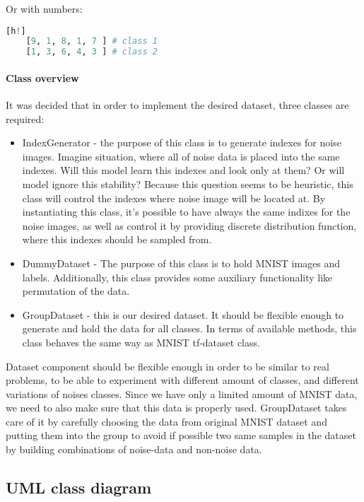 Or with numbers:
\begin{lstlisting}[language=Python][h!]
	[9, 1, 8, 1, 7 ] # class 1
	[1, 3, 6, 4, 3 ] # class 2
\end{lstlisting}



\paragraph{Class overview}

It was decided that in order to implement
the desired dataset, three classes are required:
\begin{itemize}
	\item IndexGenerator - the purpose of this class is to generate indexes for
		noise images. Imagine situation, where all of noise data is placed into
		the same indexes. Will this model learn this indexes and look only at
		them? Or will model ignore this stability? Because this question seems
		to be heuristic, this class will control the indexes where noise image
		will be located at. By instantiating this class, it's possible to have
		always the same indixes for the noise images, as well as control it by
		providing discrete distribution function, where this indexes should be sampled from.
	\item DummyDataset - The purpose of this class is to hold MNIST images
		and labels. Additionally, this class provides some auxiliary functionality
		like permutation of the data.
	\item GroupDataset - this is our desired dataset. It should be flexible
		enough to generate and hold the data for all classes. In terms of
		available methods, this class behaves the same way as MNIST tf-dataset class.
\end{itemize}

Dataset component should be flexible enough in order to be similar to real problems,
to be able to experiment with different amount of classes, and
different variations of noises classes. Since we have only a limited amount of MNIST data,
we need to also make sure that this data is properly used. GroupDataset takes
care of it by carefully choosing the data from original MNIST dataset and putting
them into the group to avoid if possible two same samples in the dataset by building
combinations of noise-data and non-noise data.

\subsection{UML class diagram}


